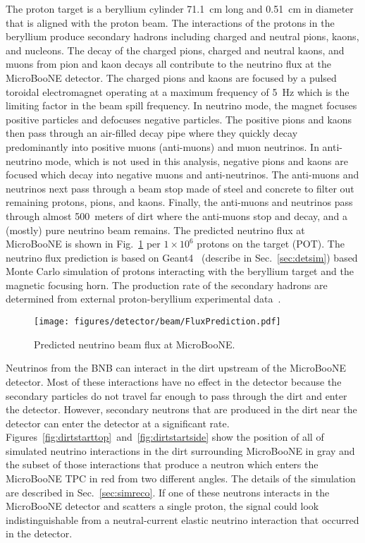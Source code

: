   The proton target is a beryllium cylinder 71.1~cm long and 0.51~cm in
  diameter that is aligned with the proton beam. The interactions of the
  protons in the beryllium produce secondary hadrons including charged and
  neutral pions, kaons, and nucleons. The decay of the charged pions, charged
  and neutral kaons, and muons from pion and kaon decays all contribute to the
  neutrino flux at the MicroBooNE detector. The charged pions and kaons are
  focused by a pulsed toroidal electromagnet operating at a maximum frequency
  of 5~Hz which is the limiting factor in the beam spill frequency. In neutrino
  mode, the magnet focuses positive particles and defocuses negative particles.
  The positive pions and kaons then pass through an air-filled decay pipe where
  they quickly decay predominantly into positive muons (anti-muons) and muon
  neutrinos. In anti-neutrino mode, which is not used in this analysis,
  negative pions and kaons are focused which decay into negative muons and
  anti-neutrinos. The anti-muons and neutrinos next pass through a beam stop
  made of steel and concrete to filter out remaining protons, pions, and kaons.
  Finally, the anti-muons and neutrinos pass through almost 500~meters of dirt
  where the anti-muons stop and decay, and a (mostly) pure neutrino beam
  remains.  The predicted neutrino flux at MicroBooNE is shown in
  Fig.~\ref{fig:beamflux} per $1\times 10^6$ protons on the target (POT). The
  neutrino flux prediction is based on Geant4~\cite{Agostinelli:2002hh}
  (describe in Sec.~\ref{sec:detsim}) based Monte Carlo simulation of protons
  interacting with the beryllium target and the magnetic focusing horn. The
  production rate of the secondary hadrons are determined from external
  proton-beryllium experimental data~\cite{Catanesi:2007ab}.

  \begin{figure}[h]
    \centering
    \texttt{[image: figures/detector/beam/FluxPrediction.pdf]}
    \caption{Predicted neutrino beam flux at MicroBooNE.}
    \label{fig:beamflux}
  \end{figure}

  Neutrinos from the BNB can interact in the dirt upstream of the MicroBooNE
  detector. Most of these interactions have no effect in the detector because
  the secondary particles do not travel far enough to pass through the dirt and
  enter the detector. However, secondary neutrons that are produced in the dirt
  near the detector can enter the detector at a significant rate.
  Figures~\ref{fig:dirtstarttop}~and~\ref{fig:dirtstartside} show the position
  of all of simulated neutrino interactions in the dirt surrounding MicroBooNE
  in gray and the subset of those interactions that produce a neutron which
  enters the MicroBooNE TPC in red from two different angles. The details of
  the simulation are described in Sec.~\ref{sec:simreco}. If one of these
  neutrons interacts in the MicroBooNE detector and scatters a single proton,
  the signal could look indistinguishable from a neutral-current elastic
  neutrino interaction that occurred in the detector.

